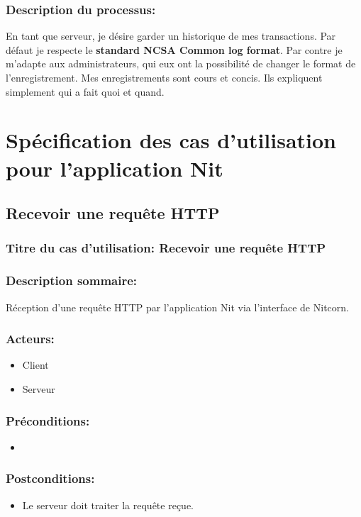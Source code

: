 \documentclass{scrreprt}
\begin{document}
\subsubsection{Description du processus:}En tant que serveur, je désire garder un historique de mes transactions. Par
défaut je respecte le \textbf{standard NCSA Common log format}\cite{NCSA}. Par contre je m'adapte
aux administrateurs, qui eux ont la possibilité de changer le format de
l'enregistrement. Mes enregistrements sont cours et concis. Ils expliquent
simplement qui a fait quoi et quand.

\section{Spécification des cas d'utilisation pour l'application Nit}

\subsection{Recevoir une requête HTTP}

\subsubsection{Titre du cas d'utilisation: Recevoir une requête HTTP}

\subsubsection{Description sommaire:}
Réception d'une requête HTTP par l'application Nit via l'interface de Nitcorn.

\subsubsection{Acteurs:}
\begin{itemize}
	\item Client
    	\item Serveur
\end{itemize}

\subsubsection{Préconditions:}
\begin{itemize}
    \item   
\end{itemize} 

\subsubsection{Postconditions:}
\begin{itemize}
    \item Le serveur doit traiter la requête reçue.
\end{itemize} 
\end{document}
